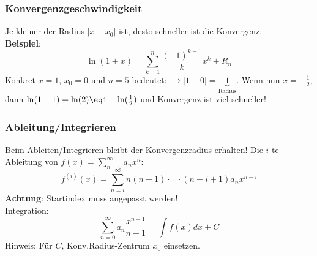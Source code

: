 \subsubsection{Konvergenzgeschwindigkeit}
Je kleiner der Radius $\left|x - x_0\right|$ ist, desto schneller ist die Konvergenz. \\
\noindent\textbf{Beispiel}:
\[
\ln(1+x) = \sum_{k=1}^{n}\frac{(-1)^{k-1}}{k} x^k + R_n
\]
\noindent Konkret $x=1$, $x_0 = 0$ und $n=5$ bedeutet: $\to \left|1 - 0\right| = \underbrace{1}_{\text{Radius}}$. Wenn nun $x = -\frac{1}{2}$, dann $\ln(1 + 1) = \ln(2) \eqi -\ln(\frac{1}{2})$ und Konvergenz ist viel schneller!


\subsubsection{Ableitung/Integrieren}
Beim Ableiten/Integrieren bleibt der Konvergenzradius erhalten! 
Die $i$-te Ableitung von $f(x)  = \sum_{n=0}^{\infty}a_nx^n$: 
\[	f^{(i)}(x) = \sum_{n=i}^{\infty}n(n-1)\cdot_{\dots}\cdot(n-i+1)a_nx^{n-i}\]
\noindent\textbf{Achtung}: Startindex muss angepasst werden! \\

Integration: \[\sum_{n=0}^{\infty}a_n\frac{x^{n+1}}{n+1}=\int f(x)dx+C\]
Hinweis: Für $C$, Konv.Radius-Zentrum $x_0$ einsetzen.